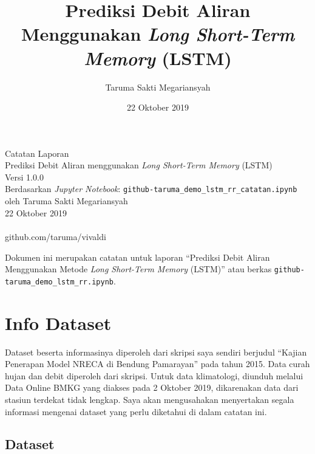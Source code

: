 \documentclass[11pt]{article}
\title{Prediksi Debit Aliran Menggunakan \emph{Long Short-Term Memory} (LSTM)}
\author{Taruma Sakti Megariansyah}
\date{22 Oktober 2019}
\begin{document}
  
	\begin{titlepage}
		\vspace*{\fill}
		\begin{center}
 		\normalsize Catatan Laporan\\
		\huge Prediksi Debit Aliran menggunakan \emph{Long Short-Term Memory} (LSTM)\\ 
		\normalsize Versi 1.0.0 \\[0.2cm]
      	\small Berdasarkan \emph{Jupyter Notebook}: \texttt{github-taruma\_demo\_lstm\_rr\_catatan.ipynb} \\[0.5cm]
		\normalsize oleh Taruma Sakti Megariansyah\\[0.5cm]
      	\normalsize 22 Oktober 2019\\[1cm]
    	\\
      	\normalsize github.com/taruma/vivaldi
		\end{center}
    	\vspace*{\fill}
	\end{titlepage}
    

    
    Dokumen ini merupakan catatan untuk laporan ``Prediksi Debit Aliran
Menggunakan Metode \emph{Long Short-Term Memory} (LSTM)'' atau berkas
\texttt{github-taruma\_demo\_lstm\_rr.ipynb}.

    \hypertarget{info-dataset}{%
\section{Info Dataset}\label{info-dataset}}

Dataset beserta informasinya diperoleh dari skripsi saya sendiri
berjudul ``Kajian Penerapan Model NRECA di Bendung Pamarayan'' pada
tahun 2015. Data curah hujan dan debit diperoleh dari skripsi. Untuk
data klimatologi, diunduh melalui Data Online BMKG yang diakses pada 2
Oktober 2019, dikarenakan data dari stasiun terdekat tidak lengkap. Saya
akan mengusahakan menyertakan segala informasi mengenai dataset yang
perlu diketahui di dalam catatan ini.

    \hypertarget{dataset}{%
\subsection{Dataset}\label{dataset}}
\end{document}
